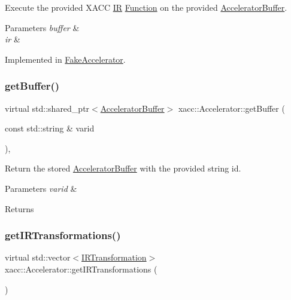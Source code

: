 Execute the provided X\+A\+CC \hyperlink{a02480}{IR} \hyperlink{a02456}{Function} on the provided \hyperlink{a02444}{Accelerator\+Buffer}.


\begin{DoxyParams}{Parameters}
{\em buffer} & \\
\hline
{\em ir} & \\
\hline
\end{DoxyParams}


Implemented in \hyperlink{a02496_a22c71bda017235865f1b7d4cc5e911fa}{Fake\+Accelerator}.

\mbox{\label{a02432_ab3820be326e28a553fed1a824f4d41d0}} 
\subsubsection{\texorpdfstring{get\+Buffer()}{getBuffer()}}
{\footnotesize\ttfamily virtual std\+::shared\+\_\+ptr$<$\hyperlink{a02444}{Accelerator\+Buffer}$>$ xacc\+::\+Accelerator\+::get\+Buffer (\begin{DoxyParamCaption}\item[{const std\+::string \&}]{varid }\end{DoxyParamCaption})\hspace{0.3cm}{\ttfamily [inline]}, {\ttfamily [virtual]}}

Return the stored \hyperlink{a02444}{Accelerator\+Buffer} with the provided string id.


\begin{DoxyParams}{Parameters}
{\em varid} & \\
\hline
\end{DoxyParams}
\begin{DoxyReturn}{Returns}

\end{DoxyReturn}
\mbox{\label{a02432_ad6e4a642dcb24e552675bcbeff1e1b04}} 
\subsubsection{\texorpdfstring{get\+I\+R\+Transformations()}{getIRTransformations()}}
{\footnotesize\ttfamily virtual std\+::vector$<$\hyperlink{a02484}{I\+R\+Transformation}$>$ xacc\+::\+Accelerator\+::get\+I\+R\+Transformations (\begin{DoxyParamCaption}{ }\end{DoxyParamCaption})\hspace{0.3cm}{\ttfamily [pure virtual]}}

